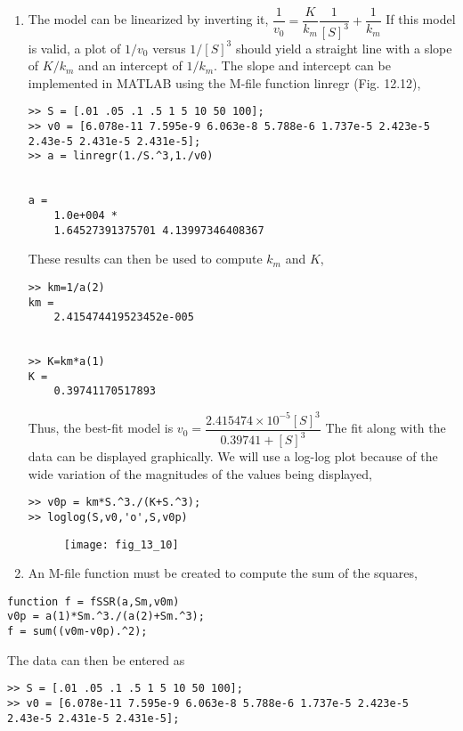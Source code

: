\documentclass[../main.tex]{subfiles}
\begin{document}
\section{}
\begin{enumerate}[label=\bfseries(\alph*)]
\item The model can be linearized by inverting it,
	\bigbreak
$\dfrac{1}{v_{0}}=\dfrac{K}{k_{m}} \dfrac{1}{[S]^{3}}+\dfrac{1}{k_{m}}$
	\bigbreak
If this model is valid, a plot of $1 / v_{0}$ versus $1 /[S]^{3}$ should yield a straight line with a slope of $K / k_{m}$ and an intercept of $1 / k_{m}$. The slope and intercept can be implemented in MATLAB using the M-file function linregr (Fig. 12.12),
	\bigbreak
\begin{lstlisting}[numbers=none]
>> S = [.01 .05 .1 .5 1 5 10 50 100];
>> v0 = [6.078e-11 7.595e-9 6.063e-8 5.788e-6 1.737e-5 2.423e-5
2.43e-5 2.431e-5 2.431e-5];
>> a = linregr(1./S.^3,1./v0)


a =
	1.0e+004 *
	1.64527391375701 4.13997346408367 
\end{lstlisting}
	\bigbreak
These results can then be used to compute $k_{m}$ and $K$,
	\bigbreak
\begin{lstlisting}[numbers=none]
>> km=1/a(2)
km =
	2.415474419523452e-005


>> K=km*a(1)
K =
	0.39741170517893
\end{lstlisting}
	\bigbreak
Thus, the best-fit model is 
	\bigbreak
$v_{0}=\dfrac{2.415474 \times 10^{-5}[S]^{3}}{0.39741+[S]^{3}}$
	\bigbreak
The fit along with the data can be displayed graphically. We will use a log-log plot because
of the wide variation of the magnitudes of the values being displayed, 
	\bigbreak
\begin{lstlisting}[numbers=none]
>> v0p = km*S.^3./(K+S.^3);
>> loglog(S,v0,'o',S,v0p) 
\end{lstlisting}
	\bigbreak
	\begin{figure}[H]
		\texttt{[image: fig\_13\_10]}
		\label{fig:fig_13_10}
	\end{figure}
	\bigbreak
\item An M-file function must be created to compute the sum of the squares, 
\end{enumerate}
\begin{lstlisting}[numbers=none]
function f = fSSR(a,Sm,v0m)
v0p = a(1)*Sm.^3./(a(2)+Sm.^3);
f = sum((v0m-v0p).^2); 
\end{lstlisting}
	\bigbreak
The data can then be entered as
	\bigbreak
\begin{lstlisting}[numbers=none]
>> S = [.01 .05 .1 .5 1 5 10 50 100];
>> v0 = [6.078e-11 7.595e-9 6.063e-8 5.788e-6 1.737e-5 2.423e-5
2.43e-5 2.431e-5 2.431e-5]; 
\end{lstlisting}
\end{document}
